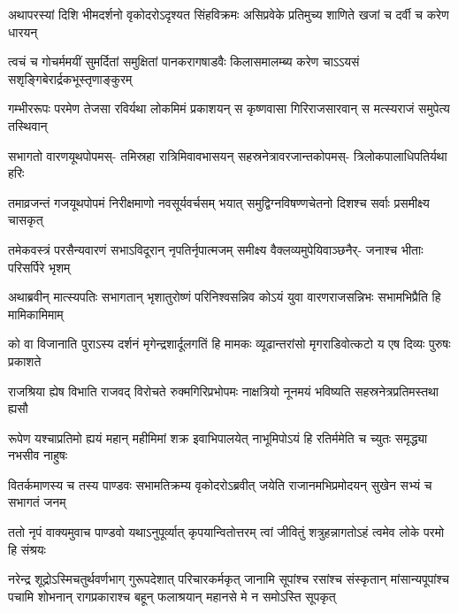 \fourlineindentedshloka
{अथापरस्यां दिशि भीमदर्शनो}
{वृकोदरोऽदृश्यत सिंहविक्रमः}
{असिप्रवेके प्रतिमुच्य शाणिते}
{खजां च दर्वी च करेण धारयन्}


\fourlineindentedshloka
{त्वचं च गोचर्ममयीं सुमर्दितां}
{समुक्षितां पानकरागषाडवैः}
{किलासमालम्ब्य करेण चाऽऽयसं}
{सशृङ्गिबेरार्द्रकभूस्तृणाङ्कुरम्}


\fourlineindentedshloka
{गम्भीररूपः परमेण तेजसा}
{रविर्यथा लोकमिमं प्रकाशयन्}
{स कृष्णवासा गिरिराजसारवान्}
{स मत्स्यराजं समुपेत्य तस्थिवान्}


\fourlineindentedshloka
{सभागतो वारणयूथपोपमस्-}
{तमिस्रहा रात्रिमिवावभासयन्}
{सहस्रनेत्रावरजान्तकोपमस्-}
{त्रिलोकपालाधिपतिर्यथा हरिः}


\fourlineindentedshloka
{तमाव्रजन्तं गजयूथपोपमं}
{निरीक्षमाणो नवसूर्यवर्चसम्}
{भयात् समुद्विग्नविषण्णचेतनो}
{दिशश्च सर्वाः प्रसमीक्ष्य चासकृत्}


\fourlineindentedshloka
{तमेकवस्त्रं परसैन्यवारणं}
{सभाऽविदूरान् नृपतिर्नृपात्मजम्}
{समीक्ष्य वैक्लव्यमुपेयिवाञ्छनैर्-}
{जनाश्च भीताः परिसर्पिरे भृशम्}


\fourlineindentedshloka
{अथाब्रवीन् मात्स्यपतिः सभागतान्}
{भृशातुरोष्णं परिनिश्वसन्निव}
{कोऽयं युवा वारणराजसन्निभः}
{सभामभिप्रैति हि मामिकामिमाम्}


\fourlineindentedshloka
{को वा विजानाति पुराऽस्य दर्शनं}
{मृगेन्द्रशार्दूलगतिं हि मामकः}
{व्यूढान्तरांसो मृगराडिवोत्कटो}
{य एष दिव्यः पुरुषः प्रकाशते}


\fourlineindentedshloka
{राजश्रिया ह्येष विभाति राजवद्}
{विरोचते रुक्मगिरिप्रभोपमः}
{नाक्षत्रियो नूनमयं भविष्यति}
{सहस्रनेत्रप्रतिमस्तथा ह्यसौ}


\fourlineindentedshloka
{रूपेण यश्चाप्रतिमो ह्ययं महान्}
{महीमिमां शक्र इवाभिपालयेत्}
{नाभूमिपोऽयं हि रतिर्ममेति च}
{च्युतः समृद्ध्या नभसीव नाहुषः}



\fourlineindentedshloka
{वितर्कमाणस्य च तस्य पाण्डवः}
{सभामतिक्रम्य वृकोदरोऽब्रवीत्}
{जयेति राजानमभिप्रमोदयन्}
{सुखेन सभ्यं च सभागतं जनम्}


\fourlineindentedshloka
{ततो नृपं वाक्यमुवाच पाण्डवो}
{यथाऽनुपूर्व्यात् कृपयान्वितोत्तरम्}
{त्वां जीवितुं शत्रुहन्नागतोऽहं}
{त्वमेव लोके परमो हि संश्रयः}


\sixlineindentedshloka
{नरेन्द्र शूद्रोऽस्मिचतुर्थवर्णभाग्}
{गुरूपदेशात् परिचारकर्मकृत्}
{जानामि सूपांश्च रसांश्च संस्कृतान्}
{मांसान्यपूपांश्च पचामि शोभनान्}
{रागप्रकाराश्च बहून् फलाश्रयान्}
{महानसे मे न समोऽस्ति सूपकृत्}



